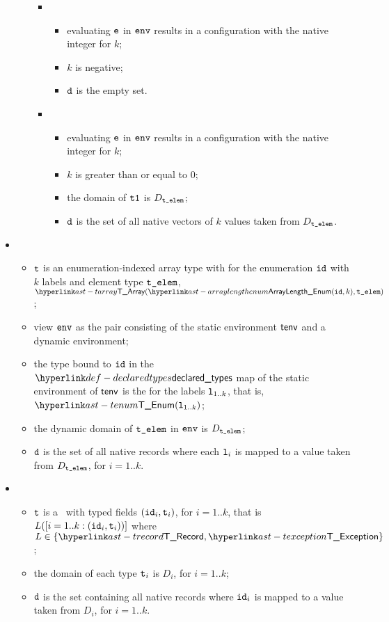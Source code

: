 \begin{itemize}
\begin{itemize}
\begin{itemize}
      \item {}
      \begin{itemize}
        \item evaluating $\texttt{e}$ in $\texttt{env}$ results in a configuration with the native integer for $k$;
        \item $k$ is negative;
        \item $\texttt{d}$ is the empty set.
      \end{itemize}

      \item {}
      \begin{itemize}
        \item evaluating $\texttt{e}$ in $\texttt{env}$ results in a configuration with the native integer for $k$;
        \item $k$ is greater than or equal to $0$;
        \item the domain of $\texttt{t1}$ is $D_{\texttt{t\_elem}}$;
        \item $\texttt{d}$ is the set of all native vectors of $k$ values taken from $D_{\texttt{t\_elem}}$.
      \end{itemize}
    \end{itemize}
  \end{itemize}

  \item {}
  \begin{itemize}
    \item $\texttt{t}$ is an enumeration-indexed array type with for the enumeration $\texttt{id}$ with $k$ labels and element type $\texttt{t\_elem}$,
          $\TArray(\ArrayLengthEnum(\id, k), \telem)$;
    \item view $\texttt{env}$ as the pair consisting of the static environment $\textsf{tenv}$ and a dynamic environment;
    \item the type bound to $\texttt{id}$ in the $\declaredtypes$ map of the static environment of $\textsf{tenv}$ is the \enumerationtypeterm{}
          for the labels $\texttt{l}_{1..k}$, that is, $\TEnum(\vl_{1..k})$;
    \item the dynamic domain of $\texttt{t\_elem}$ in $\texttt{env}$ is $D_{\texttt{t\_elem}}$;
    \item $\texttt{d}$ is the set of all native records where each $\texttt{l}_i$ is mapped to a value taken from $D_{\texttt{t\_elem}}$, for $i=1..k$.
  \end{itemize}

  \item {}
  \begin{itemize}
    \item $\texttt{t}$ is a \structuredtype\ with typed fields $(\texttt{id}_i, \texttt{t}_i)$, for $i=1..k$, that is $L([i=1..k: (\texttt{id}_i,\texttt{t}_i))]$
    where $L\in\{\TRecord, \TException\}$;
    \item the domain of each type $\texttt{t}_i$ is $D_i$, for $i=1..k$;
    \item $\texttt{d}$ is the set containing all native records where $\texttt{id}_i$ is mapped to a value taken from $D_i$, for $i=1..k$.
  \end{itemize}


\end{itemize}
